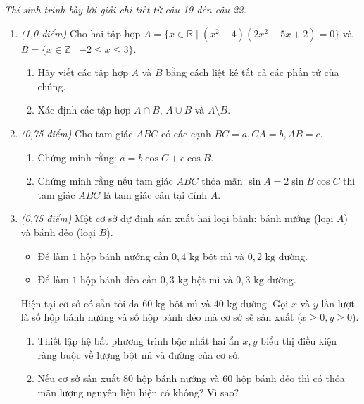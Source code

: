\documentclass[12pt,a4paper]{article}
\newcommand{\parttitle}[1]{\par\vspace{1.5pt}{\large\bfseries\color{ink}#1}\par\vspace{1pt}}
\begin{document}
\parttitle{PHẦN IV. Tự luận}
\textit{Thí sinh trình bày lời giải chi tiết từ câu 19 đến câu 22.}
\begin{enumerate}[resume]
\item \textit{(1,0 điểm)} Cho hai tập hợp $A = \{x \in \mathbb{R} \mid (x^2 - 4)(2x^2 - 5x + 2) = 0\}$ và $B = \{x \in \mathbb{Z} \mid -2 \le x \le 3\}$.
\begin{enumerate}
    \item Hãy viết các tập hợp $A$ và $B$ bằng cách liệt kê tất cả các phần tử của chúng.
    \item Xác định các tập hợp $A \cap B$, $A \cup B$ và $A \setminus B$.
\end{enumerate}

\item \textit{(0,75 điểm)} Cho tam giác $ABC$ có các cạnh $BC = a, CA = b, AB = c$.
\begin{enumerate}
    \item Chứng minh rằng: $a = b \cos C + c \cos B$.
    \item Chứng minh rằng nếu tam giác $ABC$ thỏa mãn $\sin A = 2\sin B \cos C$ thì tam giác $ABC$ là tam giác cân tại đỉnh $A$.
\end{enumerate}

\item \textit{(0,75 điểm)} Một cơ sở dự định sản xuất hai loại bánh: bánh nướng (loại $A$) và bánh dẻo (loại $B$).
\begin{itemize}[leftmargin=0.5cm]
    \item Để làm $1$ hộp bánh nướng cần $0{,}4\text{ kg}$ bột mì và $0{,}2\text{ kg}$ đường.
    \item Để làm $1$ hộp bánh dẻo cần $0{,}3\text{ kg}$ bột mì và $0{,}3\text{ kg}$ đường.
\end{itemize}
Hiện tại cơ sở có sẵn tối đa $60\text{ kg}$ bột mì và $40\text{ kg}$ đường. Gọi $x$ và $y$ lần lượt là số hộp bánh nướng và số hộp bánh dẻo mà cơ sở sẽ sản xuất ($x \ge 0, y \ge 0$).
\begin{enumerate}
    \item Thiết lập hệ bất phương trình bậc nhất hai ẩn $x, y$ biểu thị điều kiện ràng buộc về lượng bột mì và đường của cơ sở.
    \item Nếu cơ sở sản xuất $80$ hộp bánh nướng và $60$ hộp bánh dẻo thì có thỏa mãn lượng nguyên liệu hiện có không? Vì sao?
\end{enumerate}


\end{enumerate}
\end{document}
